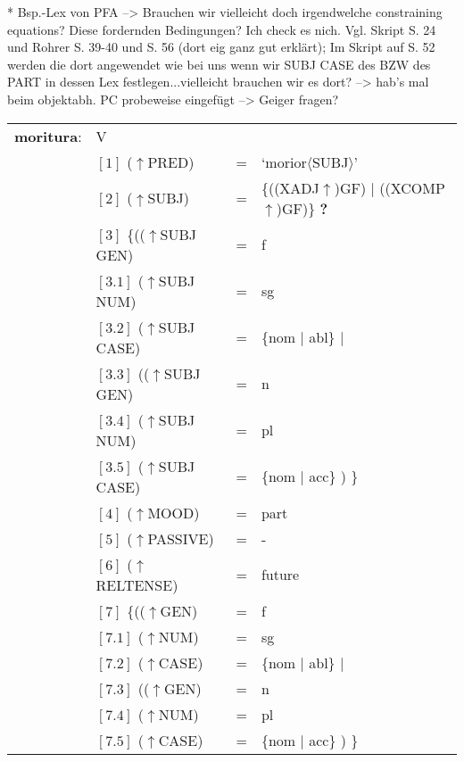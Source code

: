 \documentclass[12pt,a4paper]{article}
\begin{document}
* Bsp.-Lex von PFA
--> Brauchen wir vielleicht doch irgendwelche constraining equations? Diese fordernden Bedingungen? Ich check es nich. Vgl. Skript S. 24 und Rohrer S. 39-40 und S. 56 (dort eig ganz gut erklärt); Im Skript auf S. 52 werden die dort angewendet wie bei uns wenn wir SUBJ CASE des BZW des PART in dessen Lex festlegen...vielleicht brauchen wir es dort? --> hab's mal beim objektabh. PC probeweise eingefügt --> Geiger fragen?
\begin{singlespace}
\begin{tabular}{ l  l  l  l  } 
\textbf{moritura}: & V \\
$\qquad$ & $[1]$ \:  ($\uparrow$PRED) & = & `morior$\langle$SUBJ$\rangle$'\\
$\qquad$ & $[2]$ \:  ($\uparrow$SUBJ) & = & \{((XADJ$\uparrow$)GF) $\mid$ ((XCOMP$\uparrow$)GF)\} \textbf{?} \\
$\qquad$ & $[3]$ \:  \{(($\uparrow$SUBJ GEN) & = & f \\ 
$\qquad$ & $[3.1]$ \:  ($\uparrow$SUBJ NUM) & = & sg \\
$\qquad$ & $[3.2]$ \:  ($\uparrow$SUBJ CASE) & = & \{nom $\mid$ abl\} $\mid$\\
$\qquad$ & $[3.3]$ \: (($\uparrow$SUBJ GEN) & = & n \\
$\qquad$ & $[3.4]$ \:  ($\uparrow$SUBJ NUM) & = & pl \\
$\qquad$ & $[3.5]$ \:  ($\uparrow$SUBJ CASE) & = & \{nom $\mid$ acc\} ) \}\\
$\qquad$ & $[4]$ \:  ($\uparrow$MOOD) & = & part\\
$\qquad$ & $[5]$ \:  ($\uparrow$PASSIVE) & = & - \\
$\qquad$ & $[6]$ \:  ($\uparrow$RELTENSE) & = & future \\
$\qquad$ & $[7]$ \:  \{(($\uparrow$GEN) & = & f \\ 
$\qquad$ & $[7.1]$ \:  ($\uparrow$NUM) & = & sg \\
$\qquad$ & $[7.2]$ \:  ($\uparrow$CASE) & = & \{nom $\mid$ abl\} $\mid$\\
$\qquad$ & $[7.3]$ \: (($\uparrow$GEN) & = & n \\
$\qquad$ & $[7.4]$ \:  ($\uparrow$NUM) & = & pl \\
$\qquad$ & $[7.5]$ \:  ($\uparrow$CASE) & = & \{nom $\mid$ acc\} ) \}\\
\end{tabular}
\newline
\newline
\end{singlespace}
\end{document}
